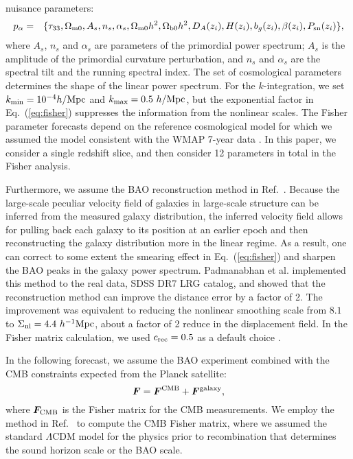 \documentclass[prd,onecolumn,notitlepage,amsmath,amssymb,floatfix,superscriptaddress]{revtex4-1}
\begin{document}
nuisance parameters:
%
\begin{eqnarray}
p_{\alpha}&=&\{\tau_{33},\Omega_{\rm m0}, A_s, n_s, \alpha_s, \Omega_{\rm m0}h^2,
\Omega_{\rm b0}h^2, D_A(z_i), 
H(z_i), b_g(z_i), 
\beta(z_i), P_{\rm
sn}(z_i)  \}, 
\label{eq:parameters}
\end{eqnarray}
%
where $A_s$, $n_s$ and $\alpha_s$ are parameters of the primordial power
spectrum; $A_s$ is the amplitude of the primordial curvature
perturbation, and $n_s$ and $\alpha_s$ are the spectral tilt and the
running spectral index. The set of cosmological parameters determines
the shape of the linear power spectrum.
For the
$k$-integration, we set $k_{\rm min}=10^{-4}h/{\rm Mpc}$ and $k_{\rm
max}=0.5~h/{\rm Mpc}$, but the exponential factor in
Eq.~(\ref{eq:fisher}) suppresses the information from the nonlinear
scales. The Fisher parameter forecasts depend on the reference
cosmological model for which we assumed the model consistent with the
WMAP 7-year data \cite{WMAP7}. In this paper, we consider a single redshift slice, and
then consider 12 parameters in total in the Fisher analysis.

Furthermore, we assume the BAO reconstruction method in
Ref.~\cite{Eisensteinetal:07}.  Because the large-scale peculiar velocity
field of galaxies in large-scale structure can be inferred from the measured
galaxy distribution, the inferred velocity field allows for pulling back
each galaxy to its position at an earlier epoch and then reconstructing
the galaxy distribution more in the linear regime. As a result, one can
correct to some extent the smearing effect in Eq.~(\ref{eq:fisher}) and
sharpen the BAO peaks in the galaxy power spectrum. 
Padmanabhan et al. \citep{Padmanabhanetal:12} implemented this method to the real data,
SDSS DR7 LRG catalog, and showed that the reconstruction method can
improve the distance error by a factor of 2. The improvement was
equivalent to reducing the nonlinear smoothing scale from $8.1$ to
$\Sigma_{\rm nl}=4.4~h^{-1}{\rm Mpc}$, about a factor of 2 reduce in the
displacement field. 
In the Fisher matrix calculation, we used $c_{\rm rec}=0.5$ as a default choice 
\cite{Padmanabhanetal:12}.


In the following forecast, we assume the BAO experiment combined with
the CMB constraints expected from the Planck satellite:
%
\begin{equation}
\bm{F}=\bm{F}^{\rm CMB} + \bm{F}^{\rm galaxy},
\end{equation}
%
where $\bm{F}_{\rm CMB}$ is the Fisher matrix for the CMB measurements.
We employ the method in Ref.~\cite{Takadaetal:14} to compute the CMB
Fisher matrix, where we assumed the standard $\Lambda$CDM model for the
physics prior to recombination that determines the sound horizon scale
or the BAO scale.
\end{document}

